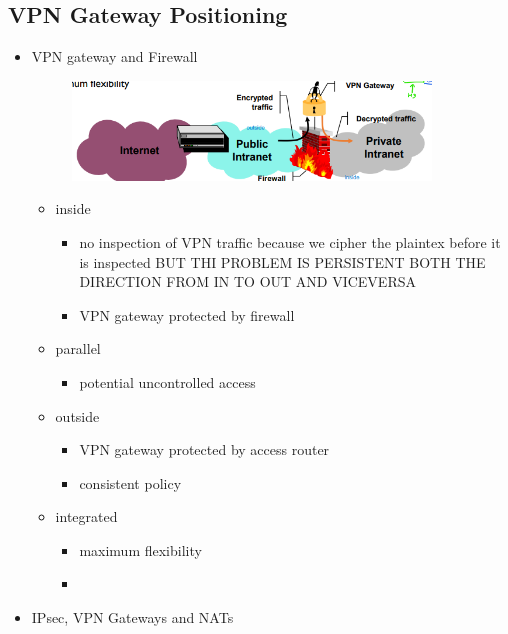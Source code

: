 \documentclass{article}
\begin{document}
\subsection{VPN Gateway Positioning}
\begin{itemize}
    \item VPN gateway and Firewall
    \begin{figure}[h]
        \centering
        \includegraphics[width=0.90\textwidth]{figure/VPN_and_firewall.png}
    \end{figure}
    \begin{itemize}
        \item inside
        \begin{itemize}
            \item no inspection of VPN traffic because we cipher the plaintex before it is inspected BUT THI PROBLEM IS PERSISTENT BOTH THE DIRECTION FROM IN TO OUT AND VICEVERSA
            \item VPN gateway protected by firewall
        \end{itemize}
        \item parallel
        \begin{itemize}
            \item potential uncontrolled access
        \end{itemize}
        \item outside
        \begin{itemize}
            \item VPN gateway protected by access router
            \item consistent policy
        \end{itemize}
        \item integrated
        \begin{itemize}
            \item maximum flexibility
        \end{itemize}
        \begin{itemize}
            \item 
        \end{itemize}
    \end{itemize}
    \item IPsec, VPN Gateways and NATs
    \begin{itemize}
        

\end{itemize}
\end{itemize}
\end{document}
